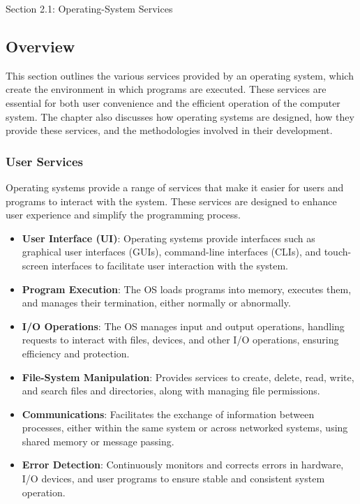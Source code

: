 \begin{notes}{Section 2.1: Operating-System Services}
    \subsection*{Overview}

    This section outlines the various services provided by an operating system, which create the environment in which programs are executed. These services are essential for both user convenience and 
    the efficient operation of the computer system. The chapter also discusses how operating systems are designed, how they provide these services, and the methodologies involved in their development.
    
    \subsubsection*{User Services}
    
    Operating systems provide a range of services that make it easier for users and programs to interact with the system. These services are designed to enhance user experience and simplify the programming process.
    
    \begin{highlight}
    
    \begin{itemize}
        \item \textbf{User Interface (UI)}: Operating systems provide interfaces such as graphical user interfaces (GUIs), command-line interfaces (CLIs), and touch-screen interfaces to facilitate 
        user interaction with the system.
        \item \textbf{Program Execution}: The OS loads programs into memory, executes them, and manages their termination, either normally or abnormally.
        \item \textbf{I/O Operations}: The OS manages input and output operations, handling requests to interact with files, devices, and other I/O operations, ensuring efficiency and protection.
        \item \textbf{File-System Manipulation}: Provides services to create, delete, read, write, and search files and directories, along with managing file permissions.
        \item \textbf{Communications}: Facilitates the exchange of information between processes, either within the same system or across networked systems, using shared memory or message passing.
        \item \textbf{Error Detection}: Continuously monitors and corrects errors in hardware, I/O devices, and user programs to ensure stable and consistent system operation.
    \end{itemize}
    

\end{highlight}
\end{notes}
